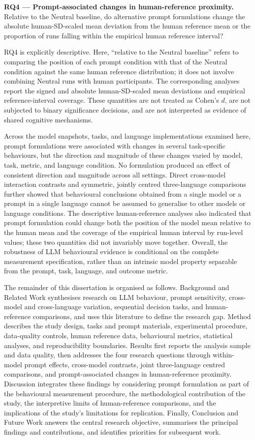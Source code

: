 \noindent\textbf{RQ4 --- Prompt-associated changes in human-reference proximity.}
Relative to the Neutral baseline, do alternative prompt formulations change the absolute human-SD-scaled mean deviation from the human reference mean or the proportion of runs falling within the empirical human reference interval?

RQ4 is explicitly descriptive. Here, ``relative to the Neutral baseline'' refers to comparing the position of each prompt condition with that of the Neutral condition against the same human reference distribution; it does not involve combining Neutral runs with human participants. The corresponding analyses report the signed and absolute human-SD-scaled mean deviations and empirical reference-interval coverage. These quantities are not treated as Cohen's \(d\), are not subjected to binary significance decisions, and are not interpreted as evidence of shared cognitive mechanisms.

Across the model snapshots, tasks, and language implementations examined here, prompt formulations were associated with changes in several task-specific behaviours, but the direction and magnitude of these changes varied by model, task, metric, and language condition. No formulation produced an effect of consistent direction and magnitude across all settings. Direct cross-model interaction contrasts and symmetric, jointly centred three-language comparisons further showed that behavioural conclusions obtained from a single model or a prompt in a single language cannot be assumed to generalise to other models or language conditions. The descriptive human-reference analyses also indicated that prompt formulation could change both the position of the model mean relative to the human mean and the coverage of the empirical human interval by run-level values; these two quantities did not invariably move together. Overall, the robustness of LLM behavioural evidence is conditional on the complete measurement specification, rather than an intrinsic model property separable from the prompt, task, language, and outcome metric.

The remainder of this dissertation is organised as follows. Background and Related Work synthesises research on LLM behaviour, prompt sensitivity, cross-model and cross-language variation, sequential decision tasks, and human-reference comparisons, and uses this literature to define the research gap. Method describes the study design, tasks and prompt materials, experimental procedure, data-quality controls, human reference data, behavioural metrics, statistical analyses, and reproducibility boundaries. Results first reports the analysis sample and data quality, then addresses the four research questions through within-model prompt effects, cross-model contrasts, joint three-language centred comparisons, and prompt-associated changes in human-reference proximity. Discussion integrates these findings by considering prompt formulation as part of the behavioural measurement procedure, the methodological contribution of the study, the interpretive limits of human-reference comparisons, and the implications of the study's limitations for replication. Finally, Conclusion and Future Work answers the central research objective, summarises the principal findings and contributions, and identifies priorities for subsequent work.
